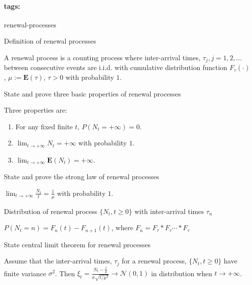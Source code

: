 \documentclass[11pt]{article}
\newcommand{\expect}[1]{\mathbf{E}(#1)}
\newcommand*{\tags}[1]{\paragraph{tags: }#1\bigskip}
\newcommand*{\xfield}[1]{\begin{mdframed}\centering #1\end{mdframed}\bigskip}
\newenvironment{field}{}{}
\newenvironment{note}{}{}
\begin{document}
%
\tags{renewal-processes}
\begin{note}
  \xfield{Definition of renewal processes}
  \begin{field}
    A renewal process is a counting process where inter-arrival times,
    \(\tau_j, j = 1,2,\ldots\) between consecutive events are
    i.i.d. with cumulative distribution function \(F_\tau(\cdot)\),
    \(\mu := \expect{\tau}\), \(\tau > 0\) with probability \(1\).
  \end{field}
\end{note}
%
\begin{note}
  \xfield{State and prove three basic properties of renewal processes}
  \begin{field}
    Three properties are:
    \begin{enumerate}
    \item For any fixed finite \(t\), \(P(N_t = +\infty) = 0\).
    \item \(\lim_{t \to +\infty} N_t = +\infty\) with probability \(1\).
    \item \(\lim_{t \to +\infty} \expect{N_t} = +\infty\).
    \end{enumerate}
  \end{field}
\end{note}
%
\begin{note}
  \xfield{State and prove the strong law of renewal processes}
  \begin{field}
    \(\displaystyle \lim_{t \to +\infty} \frac{N_t}{t} =
    \frac{1}{\mu}\) with probability \(1\).
  \end{field}
\end{note}
%
\begin{note}
  \xfield{Distribution of renewal process \(\{N_t, t \geq 0\}\) with
    inter-arrival times \(\tau_n\)}
  \begin{field}
    \(P(N_t = n) = F_n(t) - F_{n+1}(t)\), where
    \(F_n = F_\tau * F_\tau \cdots * F_\tau\)
  \end{field}
\end{note}
%
\begin{note}
  \xfield{State central limit theorem for renewal processes}
  \begin{field}
    Assume that the inter-arrival times, \(\tau_j\) for a renewal
    process, \(\{N_t, t \geq 0\}\) have finite variance
    \(\sigma^2\). Then
    \(\xi_t = \frac{N_t - \frac{t}{\mu}}{\sigma \sqrt{t / \mu^3}} \to
    \mathcal{N}(0,1)\) in distribution when \(t \to +\infty\).
  \end{field}
\end{note}
\end{document}
